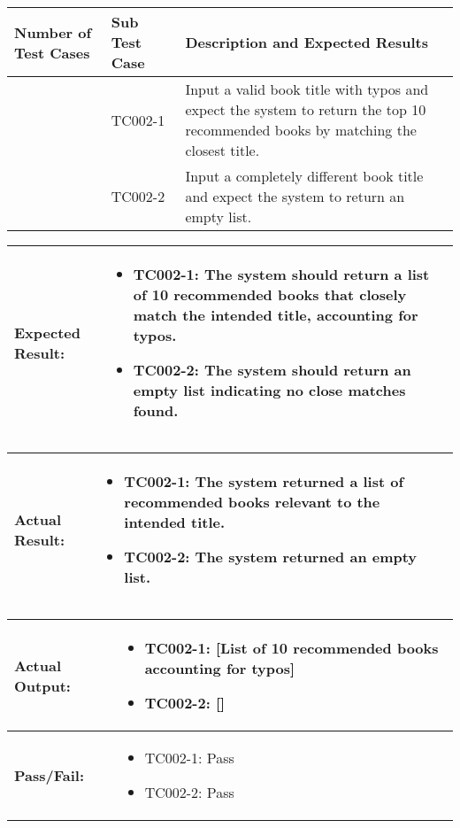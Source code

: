 \documentclass{article}
\begin{document}
\noindent
\begin{tabularx}{\textwidth}{|>{\centering\arraybackslash}p{3cm}|>{\centering\arraybackslash}p{3cm}|X|}
    \hline
    \textbf{Number of Test Cases} & \textbf{Sub Test Case} & \textbf{Description and Expected Results} \\ \hline
    1 & TC002-1 & Input a valid book title with typos and expect the system to return the top 10 recommended books by matching the closest title. \\ \hline
    2 & TC002-2 & Input a completely different book title and expect the system to return an empty list. \\ \hline
\end{tabularx}

\noindent
\begin{tabularx}{\textwidth}{|>{\raggedright\arraybackslash}p{4cm}|X|}
    \hline
    \textbf{Expected Result:} & 
    \begin{itemize}
        \item TC002-1: The system should return a list of 10 recommended books that closely match the intended title, accounting for typos.
        \item TC002-2: The system should return an empty list indicating no close matches found.
    \end{itemize}
    \\ \hline
\end{tabularx}

\noindent
\begin{tabularx}{\textwidth}{|>{\raggedright\arraybackslash}p{4cm}|X|}
    \hline
    \textbf{Actual Result:} & 
    \begin{itemize}
        \item TC002-1: The system returned a list of recommended books relevant to the intended title.
        \item TC002-2: The system returned an empty list.
    \end{itemize}
    \\ \hline
\end{tabularx}

\noindent
\begin{tabularx}{\textwidth}{|>{\raggedright\arraybackslash}p{4cm}|X|}
    \hline
    \textbf{Actual Output:} & 
    \begin{itemize}
        \item TC002-1: [List of 10 recommended books accounting for typos]
        \item TC002-2: []
    \end{itemize}
    \\ \hline
    \textbf{Pass/Fail:} & 
    \begin{itemize}
        \item TC002-1: Pass
        \item TC002-2: Pass
    \end{itemize}
    \\ \hline
\end{tabularx}
\end{document}
